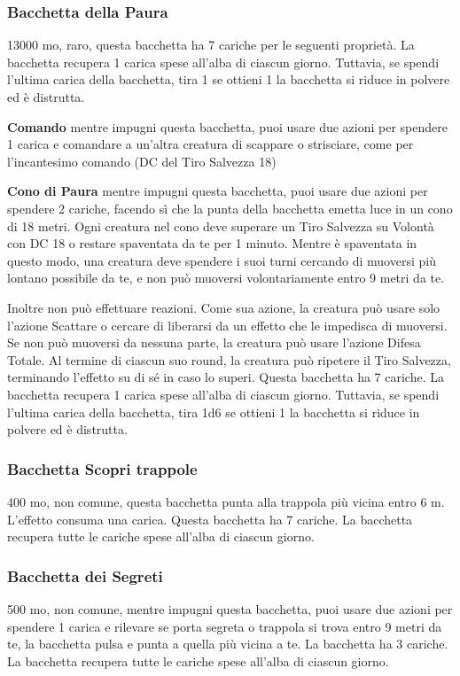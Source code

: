 \begin{multicols}{2}
	\subsubsection*{Bacchetta della Paura}
	13000 mo, raro, questa bacchetta ha 7 cariche per le seguenti proprietà. La bacchetta recupera 1 carica spese all'alba di ciascun giorno. Tuttavia, se spendi l'ultima carica della bacchetta, tira 1 se ottieni 1 la bacchetta si riduce in polvere ed è distrutta.

	\textbf{Comando} mentre impugni questa bacchetta, puoi usare due azioni per spendere 1 carica e comandare a un'altra creatura di scappare o strisciare, come per l'incantesimo comando (DC del Tiro Salvezza 18)

	\textbf{Cono di Paura} mentre impugni questa bacchetta, puoi usare due azioni per spendere 2 cariche, facendo sì che la punta della bacchetta emetta luce in un cono di 18 metri. Ogni creatura nel cono deve superare un Tiro Salvezza su Volontà con DC 18 o restare spaventata da te per 1 minuto. Mentre è spaventata in questo modo, una creatura deve spendere i suoi turni cercando di muoversi più lontano possibile da te, e non può muoversi volontariamente entro 9 metri da te.

	Inoltre non può effettuare reazioni. Come sua azione, la creatura può usare solo l'azione Scattare o cercare di liberarsi da un effetto che le impedisca di muoversi. Se non può muoversi da nessuna parte, la creatura può usare l'azione Difesa Totale. Al termine di ciascun suo round, la creatura può ripetere il Tiro Salvezza, terminando l'effetto su di sé in caso lo superi. Questa bacchetta ha 7 cariche. La bacchetta recupera 1 carica spese all'alba di ciascun giorno. Tuttavia, se spendi l'ultima carica della bacchetta, tira 1d6 se ottieni 1 la bacchetta si riduce in polvere ed è distrutta.

	\subsubsection*{Bacchetta Scopri trappole}
	400 mo, non comune, questa bacchetta punta alla trappola più vicina entro 6 m. L'effetto consuma una carica. Questa bacchetta ha 7 cariche. La bacchetta recupera tutte le cariche spese all'alba di ciascun giorno.

	\subsubsection*{Bacchetta dei Segreti}
	500 mo, non comune, mentre impugni questa bacchetta, puoi usare due azioni per spendere 1 carica e rilevare se porta segreta o trappola si trova entro 9 metri da te, la bacchetta pulsa e punta a quella più vicina a te. La bacchetta ha 3 cariche. La bacchetta recupera tutte le cariche spese all'alba di ciascun giorno.



\end{multicols}
